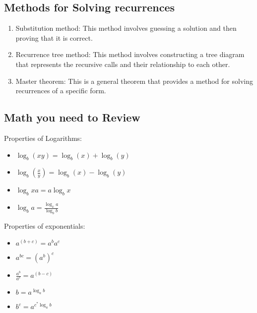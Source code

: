 \documentclass{article}
\begin{document}
\subsection{Methods for Solving recurrences}
\begin{enumerate}
    \item Substitution method: This method involves guessing a solution and then proving that it is correct.
    \item Recurrence tree method: This method involves constructing a tree diagram that represents the recursive calls and their relationship to each other.
    \item Master theorem: This is a general theorem that provides a method for solving recurrences of a specific form.
\end{enumerate}
\subsection{Math you need to Review}
Properties of Logarithms:
\begin{itemize}
    \item $\log_b (xy) = \log_b(x) + \log_b(y)$
    \item $\log_b(\frac{x}{y}) = \log_b(x) - \log_b(y)$
    \item $\log_b xa = a\log_b x$
    \item $\log_b a = \frac{\log_x a}{\log_b b}$
\end{itemize}
Properties of exponentials:
\begin{itemize}
    \item $a^{(b+c)} = a^b a^c$
    \item $a^{bc} = (a^b) ^c$
    \item $\frac{a^b}{a^c} = a^{(b-c)}$
    \item $b = a^{\log_a b}$
    \item $b^c = a^{c^*\log_a b}$
\end{itemize}
\end{document}
